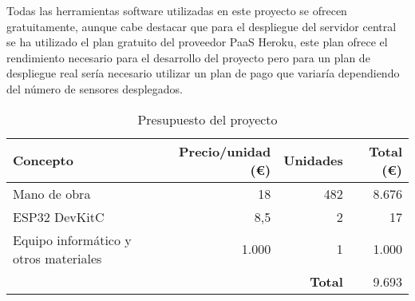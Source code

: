 \documentclass[../proyecto.tex]{subfiles}
\begin{document}
Todas las herramientas software utilizadas en este proyecto se ofrecen gratuitamente, aunque cabe destacar que para el despliegue del servidor central se ha utilizado el plan gratuito del proveedor PaaS Heroku, este plan ofrece el rendimiento necesario para el desarrollo del proyecto pero para un plan de despliegue real sería necesario utilizar un plan de pago que variaría dependiendo del número de sensores desplegados.\\

\begin{table}[H]
\centering
\begin{tabular}{ |l|r|r|r| }
\hline
\textbf{Concepto} & \textbf{Precio/unidad (€)} & \textbf{Unidades} & \textbf{Total (€)}\\
\hline\hline
Mano de obra  & 18  &  482  & 8.676   \\ \hline
ESP32 DevKitC  & 8,5  & 2 & 17\\ \hline
Equipo informático y otros materiales & 1.000 & 1 & 1.000 \\ \hline
 &  & \textbf{Total} & 9.693\\ \hline
\end{tabular}
\caption{Presupuesto del proyecto}
\label{table:presupuesto_proyecto}
\end{table}
\end{document}
